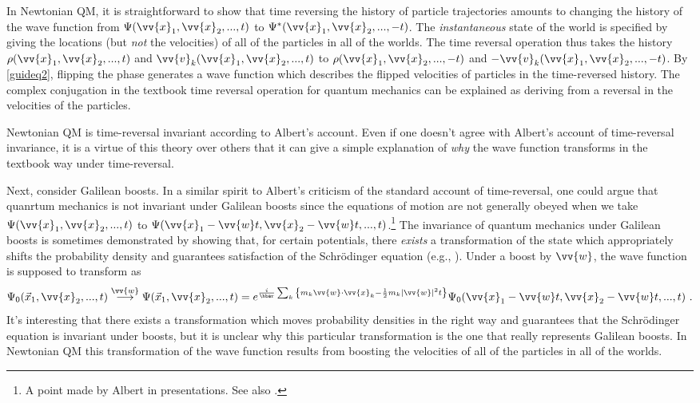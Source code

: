 \documentclass[onecolumn,secnumarabic,balancelastpage,amsmath,amssymb,nofootinbib]{article}
\begin{document}
In Newtonian QM, it is straightforward to show that time reversing the history of particle trajectories amounts to changing the history of the wave function from $\Psi(\vv{x}_1,\vv{x}_2,...,t)$ to $\Psi^*(\vv{x}_1,\vv{x}_2,...,-t)$.  The \emph{instantaneous} state of the world is specified by giving the locations (but \emph{not} the velocities) of all of the particles in all of the worlds.  The time reversal operation thus takes the history $\rho(\vv{x}_1,\vv{x}_2,...,t)$ and $\vv{v}_k(\vv{x}_1,\vv{x}_2,...,t)$ to $\rho(\vv{x}_1,\vv{x}_2,...,-t)$ and $-\vv{v}_k(\vv{x}_1,\vv{x}_2,...,-t)$.  By \eqref{guideq2}, flipping the phase generates a wave function which describes the flipped velocities of particles in the time-reversed history.  The complex conjugation in the textbook time reversal operation for quantum mechanics can be explained as deriving from a reversal in the velocities of the particles.

Newtonian QM is time-reversal invariant according to Albert's account.  Even if one doesn't agree with Albert's account of time-reversal invariance, it is a virtue of this theory over others that it can give a simple explanation of \emph{why} the wave function transforms in the textbook way under time-reversal.

Next, consider Galilean boosts.  In a similar spirit to Albert's criticism of the standard account of time-reversal, one could argue that quanrtum mechanics is not invariant under Galilean boosts since the equations of motion are not generally obeyed when we take $\Psi(\vv{x}_1,\vv{x}_2,...,t)$ to $\Psi(\vv{x}_1-\vv{w}t,\vv{x}_2-\vv{w}t,...,t)$.\footnote{A point made by Albert in presentations.  See also \citet{valentini1997}.}  The invariance of quantum mechanics under Galilean boosts is sometimes demonstrated by showing that, for certain potentials, there \emph{exists} a transformation of the state which appropriately shifts the probability density and guarantees satisfaction of the Schr\"{o}dinger equation (e.g., \citealp[]{ballentine}).  Under a boost by $\vv{w}$, the wave function is supposed to transform as
\begin{equation}
\Psi_0(\vec{x}_1,\vv{x}_2,...,t)\stackrel{\vv{w}}{\longrightarrow}\Psi(\vec{x}_1,\vv{x}_2,...,t)= e^{\frac{i}{\hbar}\sum_k{\left\{m_k \vv{w}\cdot\vv{x}_k-\frac{1}{2}m_k |\vv{w}|^2 t\right\}}}\Psi_0(\vv{x}_1-\vv{w}t,\vv{x}_2-\vv{w}t,...,t)\ .
\label{transf}
\end{equation}
It's interesting that there exists a transformation which moves probability densities in the right way and guarantees that the Schr\"{o}dinger equation is invariant under boosts, but it is unclear why this particular transformation is the one that really represents Galilean boosts.  In Newtonian QM this transformation of the wave function results from boosting the velocities of all of the particles in all of the worlds.
\end{document}
